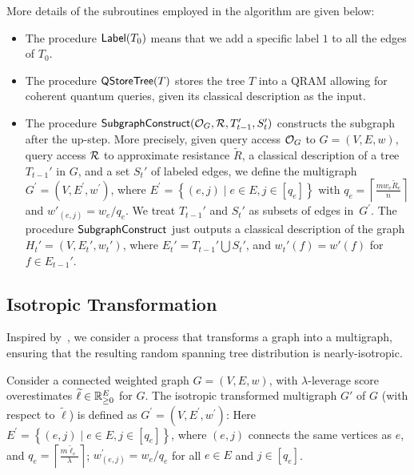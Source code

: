 \documentclass[11pt]{article}
\newcommand{\ceil}[1]{\left\lceil #1 \right\rceil}
\newcommand{\parens}[1]{( #1 )}
\newcommand{\sqb}[1]{\left[ #1 \right]}
\newcommand{\set}[1]{\left\{ #1 \right\}}
\begin{document}
{More details of the subroutines employed in the algorithm are given below:
\begin{itemize}
\item
The procedure $\mathsf{Label}(T_0)$ means that we
add a specific label $1$ to all the edges of $T_0$. 
\item
The procedure $\mathsf{QStoreTree}(T)$ stores the
tree $T$ into a QRAM allowing for coherent quantum queries,
given its classical description as the input.
\item
The procedure 
$\mathsf{SubgraphConstruct}(\mathcal{O}_G, \mathcal{R}, T_{t-1}', S_t')$ constructs the subgraph after the up-step.
More precisely, given query access $\mathcal{O}_G$ to 
$G = (V, E, w)$, 
query access $\mathcal{R}$ to approximate resistance $\widetilde{R}$, a classical description of a tree $T_{t-1}'$
in $G$, and a set $S_t'$ of labeled edges,
we define the multigraph
$G^\prime=\parens{V,E^\prime, w^\prime}$,
where 
$E^\prime=\set{\parens{e,j} \mid e \in E, j \in \sqb{q_e} }$ with
$q_e=\ceil{\frac{mw_e\widetilde{R}_e}{n}}$ and
$w'_{\parens{e,j}} =  w_{e}/q_e$.
We treat $T_{t-1}'$
and $S_t'$
as subsets of edges in~$G^{\prime}$.
The procedure $\mathsf{SubgraphConstruct}$ just
outputs a classical description of the graph
$H_t' = (V, E_{t}',w_{t}')$,
where
$E_{t}' = T_{t-1}'\bigcup S_t'$,
and $w_{t}'(f) = w'(f)$ for $f\in E_{t-1}'$.
\end{itemize}


\subsection{Isotropic Transformation}



Inspired by~\cite{anari2020isotropy,anari2021domain,ALV22}, we consider a process that transforms a graph into a multigraph, ensuring that the resulting random spanning tree distribution is nearly-isotropic. 


\begin{definition}\label{def:graph-isotropic-transformation}
    Consider a 
    connected weighted graph $G =\parens{V,E, w}$,
    with $\lambda$-leverage score overestimates $\widetilde\ell\in\mathbb{R}^E_{\geq 0}$ for $G$.
    The isotropic transformed multigraph $G'$ of $G$
    (with respect to $\widetilde{\ell}$)
    is defined
    as $G^\prime =\parens{V,E^\prime, w ^\prime}$:
    Here $E^\prime=\set{(e,j) \mid e \in E,  j \in \sqb{q_e} }$, 
    where $(e,j)$ connects the same vertices as $e$, 
    and $q_e =\ceil{\frac{m \widetilde\ell_e}{\lambda}}$;
    $w^\prime _{(e,j)}=w _e / q_e $ for all  $e \in E$ and $ j \in \sqb{q_e}$. 
\end{definition}

}
\end{document}

